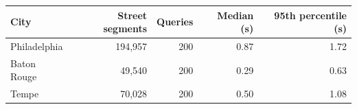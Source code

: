 \begin{tabular}{lrrrr}
\toprule
City & Street segments & Queries & Median (s) & 95th percentile (s) \\
\midrule
Philadelphia & 194,957 & 200 & 0.87 & 1.72 \\
Baton Rouge & 49,540 & 200 & 0.29 & 0.63 \\
Tempe & 70,028 & 200 & 0.50 & 1.08 \\
\bottomrule
\end{tabular}
